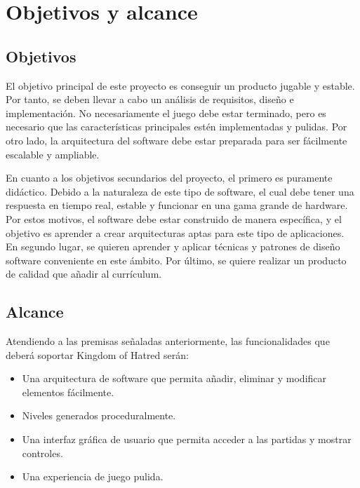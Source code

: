 \chapter{Objetivos y alcance}

\section{Objetivos}

El objetivo principal de este proyecto es conseguir un producto jugable y estable. Por tanto, se deben llevar a cabo un análisis de requisitos, diseño e implementación. No necesariamente el juego debe estar terminado, pero es necesario que las características principales estén implementadas y pulidas. Por otro lado, la arquitectura del software debe estar preparada para ser fácilmente escalable y ampliable.

En cuanto a los objetivos secundarios del proyecto, el primero es puramente didáctico. Debido a la naturaleza de este tipo de software, el cual debe tener una respuesta en tiempo real, estable y funcionar en una gama grande de hardware. Por estos motivos, el software debe estar construido de manera específica, y el objetivo es aprender a crear arquitecturas aptas para este tipo de aplicaciones. En segundo lugar, se quieren aprender y aplicar técnicas y patrones de diseño software conveniente en este ámbito. Por último, se quiere realizar un producto de calidad que añadir al currículum.


\section{Alcance}

Atendiendo a las premisas señaladas anteriormente, las funcionalidades que deberá soportar Kingdom of Hatred serán:

\begin{itemize}
	\item Una arquitectura de software que permita añadir, eliminar y modificar elementos fácilmente.
	
	\item Niveles generados proceduralmente.

	\item Una interfaz gráfica de usuario que permita acceder a las partidas y mostrar controles.

	\item Una experiencia de juego pulida.
\end{itemize}

